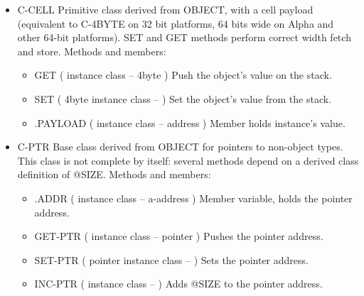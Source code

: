 \begin{;stlisting}[frame=single]
\begin{itemize}[noitemsep]
\begin{itemize}[noitemsep]
		\item SET ( 4byte instance class -- )\newline
		Set the object's value from the stack.

		\item .PAYLOAD ( instance class -- address )\newline
		Member holds instance's value.
	\end{itemize}

	\item C-CELL\newline
	Primitive class derived from OBJECT, with a cell payload
	(equivalent to C-4BYTE on 32 bit platforms, 64 bits wide on
	Alpha and other 64-bit platforms). SET and GET methods perform
	correct width fetch and store. Methods and members:
	\begin{itemize}[noitemsep]
		\item GET ( instance class -- 4byte )\newline
		Push the object's value on the stack.

		\item SET ( 4byte instance class -- )\newline
		Set the object's value from the stack.

		\item .PAYLOAD ( instance class -- address )\newline
		Member holds instance's value.
	\end{itemize}

	\item C-PTR\newline
	Base class derived from OBJECT for pointers to non-object types.
	This class is not complete by itself: several methods depend on
	a derived class definition of @SIZE. Methods and members:
	\begin{itemize}[noitemsep]
		\item .ADDR ( instance class -- a-address )\newline
		Member variable, holds the pointer address.

		\item GET-PTR ( instance class -- pointer )\newline
		Pushes the pointer address.

		\item SET-PTR ( pointer instance class -- )\newline
		Sets the pointer address.

		\item INC-PTR ( instance class -- )\newline
		Adds @SIZE to the pointer address.


\end{itemize}
\end{itemize}
\end{;stlisting}
